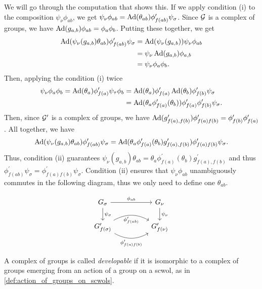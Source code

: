 We will go through the computation that shows this.
If we apply condition (i) to the composition $\psi_\nu \phi_{ab}$, we get $\psi_\nu\phi_{ab} = \operatorname{Ad}(\theta_{ab})\phi^\prime_{f(ab)}\psi_\sigma$.
Since $\mathcal{G}$ is a complex of groups, we have $\operatorname{Ad}(g_{a,b})\phi_{ab} = \phi_a\phi_b$.
Putting these together, we get
\begin{align*}
	\operatorname{Ad}(\psi_\nu(g_{a,b})\theta_{ab})\phi^\prime_{f(ab)}\psi_\sigma
	 & = \operatorname{Ad}(\psi_\nu(g_{a,b}))\psi_\nu\phi_{ab} \\
	 & = \psi_\nu\operatorname{Ad}(g_{a,b})\phi_{a,b}          \\
	 & = \psi_\nu\phi_a\phi_b
	.
\end{align*}
Then, applying the condition (i) twice
\begin{align*}
	\psi_\nu\phi_a\phi_b
	= \operatorname{Ad}(\theta_a)\phi^\prime_{f(a)}\psi_\tau\phi_b
	 & = \operatorname{Ad}(\theta_a)\phi^\prime_{f(a)}\operatorname{Ad}(\theta_b)\phi^\prime_{f(b)}\psi_\sigma                \\
	 & = \operatorname{Ad}(\theta_a\phi^\prime_{f(a)}(\theta_b))\phi^\prime_{f(a)}\phi^\prime_{f(b)}\psi_\sigma
	.
\end{align*}
Then, since $\mathcal{G}^\prime$ is a complex of groups, we have $\operatorname{Ad}(g^\prime_{f(a),f(b)})\phi^\prime_{f(a)f(b)} = \phi^\prime_{f(b)}\phi^\prime_{f(a)}$.
All together, we have
\begin{align*}
	\operatorname{Ad}(\psi_\nu(g_{a,b})\theta_{ab})\phi^\prime_{f(ab)}\psi_\sigma = \operatorname{Ad}(\theta_a\phi^\prime_{f(a)}(\theta_b)g^\prime_{f(a),f(b)})\phi^\prime_{f(a)f(b)}\psi_\sigma
	.
\end{align*}
Thus, condition (ii) guarantees $\psi_\nu(g_{a,b})\theta_{ab} = \theta_a\phi^\prime_{f(a)}(\theta_b)g^\prime_{f(a),f(b)}$ and thus $\phi^\prime_{f(ab)}\psi_\sigma = \phi^\prime_{f(a)f(b)}\psi_\sigma$.
Condition (ii) ensures that $\psi_\nu\phi_{ab}$ unambiguously commutes in the following diagram, thus we only need to define one $\theta_{ab}$.

\begin{equation*}
	\begin{tikzcd}
		G_\sigma \ar[d, "\psi_\sigma"] \ar[rr, "\phi_{ab}"] & &  G_\nu \ar[d, "\psi_\nu"]\\
		G^\prime_{f(\sigma)} \ar[rr, bend right, "\phi^\prime_{f(a)f(b)}"'] \ar[rr, bend left, "\phi^\prime_{f(ab)}"'] & & G^\prime_{f(\nu)}
	\end{tikzcd}
\end{equation*}

\begin{definition}
	A complex of groups is called \emph{developable} if it is isomorphic to a complex of groups emerging from an action of a group on a scwol, as in \cref{def:action_of_groups_on_scwols}.
\end{definition}

